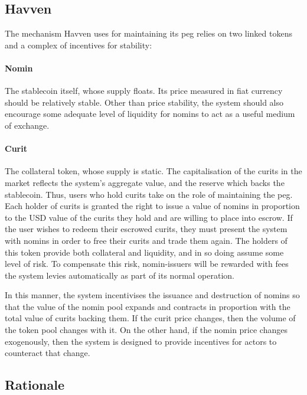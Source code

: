 \subsection{Havven}
\noindent The mechanism Havven uses for maintaining its peg relies on two linked tokens and a
complex of incentives for stability:

\paragraph{Nomin} The stablecoin itself, whose supply floats. Its price measured in fiat currency should be relatively stable.
Other than price stability, the system should also encourage some adequate level of liquidity for nomins
to act as a useful medium of exchange.

\paragraph{Curit} The collateral token, whose supply is static.
The capitalisation of the curits in the market reflects the system's aggregate value, and the reserve
which backs the stablecoin. Thus, users who hold curits take on the role of maintaining the peg. \\

\noindent Each holder of curits is granted the right to issue a value of nomins in proportion to the USD value
of the curits they hold and are willing to place into escrow. If the user wishes to redeem their escrowed curits, they must
present the system with nomins in order to free their curits and trade them again.
The holders of this token provide both collateral and liquidity, and in so doing assume some
level of risk. To compensate this risk, nomin-issuers will be rewarded with fees the system levies
automatically as part of its normal operation.

In this manner, the system incentivises the issuance and destruction of nomins so that the value of
the nomin pool expands and contracts in proportion with the total value of curits backing them.
If the curit price changes, then the volume of the token pool changes with it.
On the other hand, if the nomin price changes exogenously, then the system is designed to provide
incentives for actors to counteract that change. \\

\subsection{Rationale}


